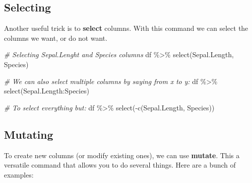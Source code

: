 \documentclass[
]{book}
\newenvironment{Shaded}{\begin{snugshade}}{\end{snugshade}}
\newcommand{\CommentTok}[1]{\textcolor[rgb]{0.56,0.35,0.01}{\textit{#1}}}
\newcommand{\FunctionTok}[1]{\textcolor[rgb]{0.00,0.00,0.00}{#1}}
\newcommand{\NormalTok}[1]{#1}
\newcommand{\SpecialCharTok}[1]{\textcolor[rgb]{0.00,0.00,0.00}{#1}}
\begin{document}
\hypertarget{selecting}{%
\subsection{Selecting}\label{selecting}}

Another useful trick is to \textbf{select} columns.
With this command we can select the columns we want, or do not want.

\begin{Shaded}
\begin{Highlighting}[]
\CommentTok{\# Selecting Sepal.Lenght and Species columns}
\NormalTok{df }\SpecialCharTok{\%\textgreater{}\%} 
  \FunctionTok{select}\NormalTok{(Sepal.Length, Species)}

\CommentTok{\# We can also select multiple columns by saying from x to y:}
\NormalTok{df }\SpecialCharTok{\%\textgreater{}\%} 
  \FunctionTok{select}\NormalTok{(Sepal.Length}\SpecialCharTok{:}\NormalTok{Species)}

\CommentTok{\# To select everything but:}
\NormalTok{df }\SpecialCharTok{\%\textgreater{}\%} 
  \FunctionTok{select}\NormalTok{(}\SpecialCharTok{{-}}\FunctionTok{c}\NormalTok{(Sepal.Length, Species))}
\end{Highlighting}
\end{Shaded}

\hypertarget{mutating}{%
\subsection{Mutating}\label{mutating}}

To create new columns (or modify existing ones), we can use \textbf{mutate}.
This a versatile command that allows you to do several things.
Here are a bunch of examples:
\end{document}
